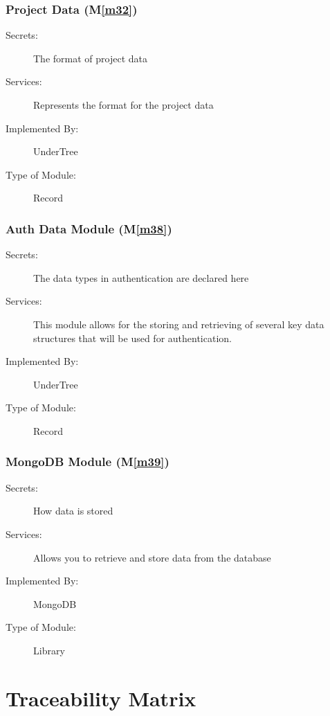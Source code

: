 \documentclass[12pt, titlepage]{article}
\newcommand{\mref}[1]{M\ref{#1}}
\begin{document}
	\subsubsection{Project Data (\mref{m32})}
	
	\begin{description}
		\item[Secrets:] The format of project data
		\item[Services:] Represents the format for the project data
		\item[Implemented By:] UnderTree
		\item[Type of Module:] Record
	\end{description}
	
	\subsubsection{Auth Data Module (\mref{m38})}
	
	\begin{description}
		\item[Secrets:] The data types in authentication are declared here
		\item[Services:] This module allows for the storing and retrieving of several key data structures that will be used for authentication.
		\item[Implemented By:] UnderTree
		\item[Type of Module:] Record
	\end{description}
	
	\subsubsection{MongoDB Module (\mref{m39})}
	
	\begin{description}
		\item[Secrets:] How data is stored
		\item[Services:] Allows you to retrieve and store data from the database
		\item[Implemented By:] MongoDB
		\item[Type of Module:] Library
	\end{description}
	
	\newpage
	
	\section{Traceability Matrix} \label{SecTM}
	
\end{document}

